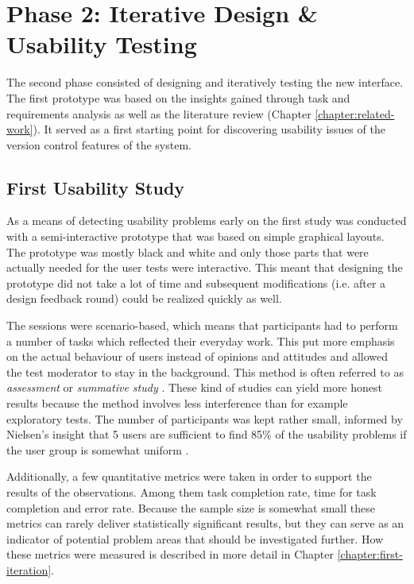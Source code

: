 \section{Phase 2: Iterative Design \& Usability Testing}
The second phase consisted of designing and iteratively testing the new interface. The first prototype was based on the insights gained through task and requirements analysis as well as the literature review (Chapter \ref{chapter:related-work}). It served as a first starting point for discovering usability issues of the version control features of the system.



\subsection{First Usability Study}
As a means of detecting usability problems early on the first study was conducted with a semi-interactive prototype that was based on simple graphical layouts. The prototype was mostly black and white and only those parts that were actually needed for the user tests were interactive. This meant that designing the prototype did not take a lot of time and subsequent modifications (i.e. after a design feedback round) could be realized quickly as well.

The sessions were scenario-based, which means that participants had to perform a number of tasks which reflected their everyday work. This put more emphasis on the actual behaviour of users instead of opinions and attitudes and allowed the test moderator to stay in the background. This method is often referred to as \textit{assessment} or \textit{summative study} \cite{rubin_handbook_2008,goodman_observing_2012}. These kind of studies can yield more honest results because the method involves less interference than for example exploratory tests. The number of participants was kept rather small, informed by Nielsen's insight that 5 users are sufficient to find 85\% of the usability problems if the user group is somewhat uniform \cite{nielsen_why_2000}.

Additionally, a few quantitative metrics were taken in order to support the results of the observations. Among them task completion rate, time for task completion and error rate. Because the sample size is somewhat small these metrics can rarely deliver statistically significant results, but they can serve as an indicator of potential problem areas that should be investigated further. How these metrics were measured is described in more detail in Chapter \ref{chapter:first-iteration}.

